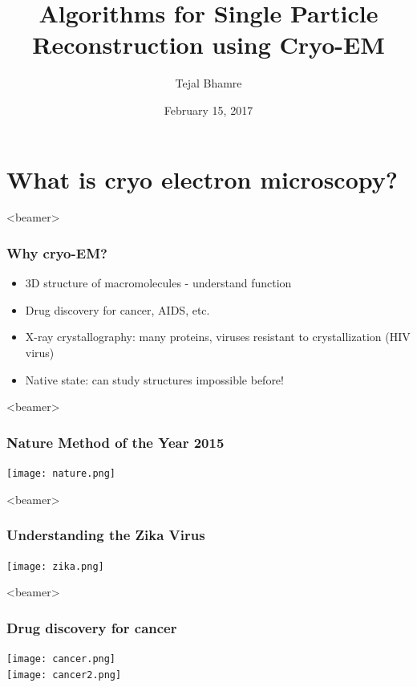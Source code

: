\documentclass{beamer}
\begin{document}
\title{Algorithms for Single Particle Reconstruction using Cryo-EM} 
\date{February 15, 2017} 
\author{Tejal Bhamre\\
} 
\begin{frame}
\titlepage 
\end{frame}

% 
% 

\section{What is cryo electron microscopy?}

\begin{frame}<beamer>
\frametitle{Why cryo-EM?}

\begin{itemize}
 \item 3D structure of macromolecules - understand function 
 \item Drug discovery for cancer, AIDS, etc.
 \item X-ray crystallography: many proteins, viruses resistant to crystallization (HIV virus)
 \item Native state: can study structures impossible before!
\end{itemize}
\end{frame}

\begin{frame}<beamer>
\frametitle{Nature Method of the Year 2015}
\centering
\texttt{[image: nature.png]}%
\end{frame}


\begin{frame}<beamer>
\frametitle{Understanding the Zika Virus}
\texttt{[image: zika.png]}%
\end{frame}

\begin{frame}<beamer>
\frametitle{Drug discovery for cancer}
\begin{center}
\texttt{[image: cancer.png]}\\\texttt{[image: cancer2.png]}%
\end{center}
\end{frame}
\end{document}

